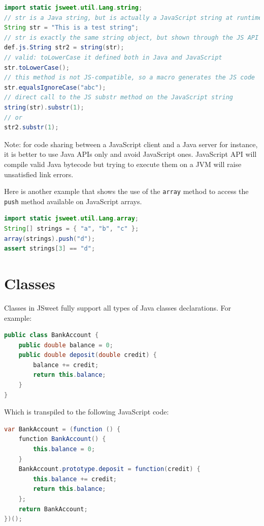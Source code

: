 \documentclass[a4paper]{report}
\begin{document}
\begin{lstlisting}[language=Java]
import static jsweet.util.Lang.string;
// str is a Java string, but is actually a JavaScript string at runtime
String str = "This is a test string";
// str is exactly the same string object, but shown through the JS API
def.js.String str2 = string(str);
// valid: toLowerCase it defined both in Java and JavaScript
str.toLowerCase(); 
// this method is not JS-compatible, so a macro generates the JS code
str.equalsIgnoreCase("abc"); 
// direct call to the JS substr method on the JavaScript string
string(str).substr(1); 
// or
str2.substr(1);
\end{lstlisting}

Note: for code sharing between a JavaScript client and a Java server for instance, it is better to use Java APIs only and avoid JavaScript ones. JavaScript API will compile valid Java bytecode but trying to execute them on a JVM will raise unsatisfied link errors.

\noindent
Here is another example that shows the use of the \texttt{array} method to access the \texttt{push} method available on JavaScript arrays.

\begin{lstlisting}[language=Java]
import static jsweet.util.Lang.array;
String[] strings = { "a", "b", "c" };
array(strings).push("d");
assert strings[3] == "d";
\end{lstlisting}

\section{Classes}

Classes in JSweet fully support all types of Java classes declarations. For example:

\begin{lstlisting}[language=Java]
public class BankAccount {  
    public double balance = 0;  
    public double deposit(double credit) {  
        balance += credit;  
        return this.balance;  
    }  
}  
\end{lstlisting}

\noindent
Which is transpiled to the following JavaScript code:

\begin{lstlisting}[language=Java]
var BankAccount = (function () {  
    function BankAccount() {  
        this.balance = 0;  
    }  
    BankAccount.prototype.deposit = function(credit) {  
        this.balance += credit;  
        return this.balance;  
    };  
    return BankAccount;  
})();
\end{lstlisting}
\end{document}
